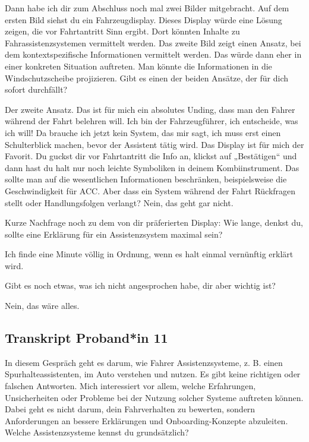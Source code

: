 \interviewerin
Dann habe ich dir zum Abschluss noch mal zwei Bilder mitgebracht. Auf
dem ersten Bild siehst du ein Fahrzeugdisplay. Dieses Display würde eine
Lösung zeigen, die vor Fahrtantritt Sinn ergibt. Dort könnten Inhalte zu
Fahrassistenzsystemen vermittelt werden. Das zweite Bild zeigt einen
Ansatz, bei dem kontextspezifische Informationen vermittelt werden. Das
würde dann eher in einer konkreten Situation auftreten. Man könnte die
Informationen in die Windschutzscheibe projizieren. Gibt es einen der
beiden Ansätze, der für dich sofort durchfällt?

Der zweite Ansatz. Das ist für mich ein absolutes Unding, dass man den
Fahrer während der Fahrt belehren will. Ich bin der Fahrzeugführer, ich
entscheide, was ich will! Da brauche ich jetzt kein System, das mir
sagt, ich muss erst einen Schulterblick machen, bevor der Assistent
tätig wird. Das Display ist für mich der Favorit. Du guckst dir vor
Fahrtantritt die Info an, klickst auf „Bestätigen“ und dann hast du halt
nur noch leichte Symboliken in deinem Kombiinstrument. Das sollte man
auf die wesentlichen Informationen beschränken, beispielsweise die
Geschwindigkeit für ACC. Aber dass ein System während der Fahrt
Rückfragen stellt oder Handlungsfolgen verlangt? Nein, das geht gar
nicht.

\interviewerin
Kurze Nachfrage noch zu dem von dir präferierten Display: Wie lange,
denkst du, sollte eine Erklärung für ein Assistenzsystem maximal sein?

Ich finde eine Minute völlig in Ordnung, wenn es halt einmal vernünftig
erklärt wird.

\interviewerin
Gibt es noch etwas, was ich nicht angesprochen habe, dir aber wichtig
ist?

Nein, das wäre alles.



\clearpage
\subsection{Transkript Proband*in 11}
\label{subsec:transkript-p11}

\interviewerin
In diesem Gespräch geht es darum, wie Fahrer Assistenzsysteme, z. B.
einen Spurhalteassistenten, im Auto verstehen und nutzen. Es gibt keine
richtigen oder falschen Antworten. Mich interessiert vor allem, welche
Erfahrungen, Unsicherheiten oder Probleme bei der Nutzung solcher
Systeme auftreten können. Dabei geht es nicht darum, dein Fahrverhalten
zu bewerten, sondern Anforderungen an bessere Erklärungen und
Onboarding-Konzepte abzuleiten. Welche Assistenzsysteme kennst du
grundsätzlich?

